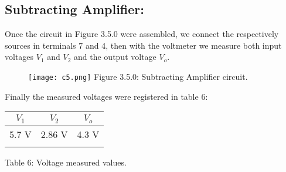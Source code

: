 \subsection{Subtracting Amplifier:}

Once the circuit in Figure 3.5.0 were assembled, we connect the respectively sources in terminals 7 and 4, then with the voltmeter we measure both input voltages $V_{1}$ and $V_{2}$ and the output voltage $V_{o}$. \hfill \break

\begin{figure}[H]
\texttt{[image: c5.png]}
\centering \linebreak \linebreak Figure 3.5.0: Subtracting Amplifier circuit.
\end{figure} \hfill

Finally the measured voltages were registered in table 6: \hfill \break

\begin{center}
\begin{tabular}[.5cm]{c c c}
\toprule
\toprule
\hspace{60pt} $V_{1}$ \hspace{60pt} & \hspace{60pt} $V_{2}$ \hspace{60pt} & \hspace{60pt} $V_{o}$ \hspace{60pt}  \\
\midrule
\midrule
5.7 V & 2.86 V & 4.3 V \\
\bottomrule
\linebreak
\end{tabular}
\linebreak Table 6: Voltage measured values.
\end{center} \hfill
